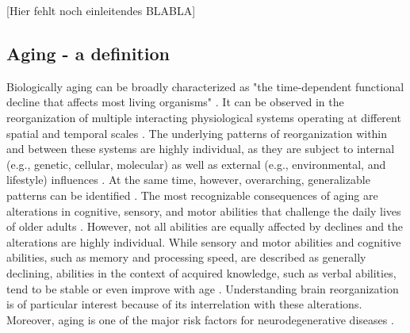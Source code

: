 [Hier fehlt noch einleitendes BLABLA]


\subsection{Aging - a definition}
Biologically aging can be broadly characterized as "the time-dependent functional decline that affects most living organisms" \cite{López-Otín2013}. It can be observed in the reorganization of multiple interacting physiological systems operating at different spatial and temporal scales \cite{Mooney2016}. The underlying patterns of reorganization within and between these systems are highly individual, as they are subject to internal (e.g., genetic, cellular, molecular) as well as external (e.g., environmental, and lifestyle) influences \cite{Smith2020, Mooney2016, Cohen2022}. At the same time, however, overarching, generalizable patterns can be identified \cite{Salthouse2019}. The most recognizable consequences of aging are alterations in cognitive, sensory, and motor abilities that challenge the daily lives of older adults \cite{Li2002}. However, not all abilities are equally affected by declines and the alterations are highly individual. While sensory and motor abilities and cognitive abilities, such as memory and processing speed, are described as generally declining, abilities in the context of acquired knowledge, such as verbal abilities, tend to be stable or even improve with age \cite{Park2009}. Understanding brain reorganization is of particular interest because of its interrelation with these alterations. Moreover, aging is one of the major risk factors for neurodegenerative diseases \cite{Hou2019}.

